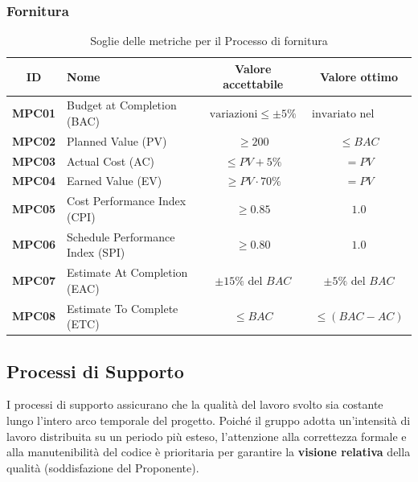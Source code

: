 \documentclass[a4paper,12pt]{article}
\begin{document}
\subsubsection{Fornitura}\label{sec:fornitura}
\begin{table}[H]
\centering
\renewcommand{\arraystretch}{1.5}
\begin{tabularx}{\textwidth}{|c|Y|c|c|}
\hline
{} \textbf{ID} & \textbf{Nome} & \textbf{Valore accettabile} & \textbf{Valore ottimo} \\ \hline
\textbf{MPC01} & Budget at Completion (BAC) & $\text{variazioni}\le \pm 5\%$ & $\text{invariato nel tempo}$ \\ \hline
\textbf{MPC02} & Planned Value (PV) & $\ge 200$ & $\le BAC$ \\ \hline
\textbf{MPC03} & Actual Cost (AC) & $\le PV + 5\%$ & $=PV$ \\ \hline
\textbf{MPC04} & Earned Value (EV) & $\ge PV \cdot 70\%$ & $=PV$ \\ \hline
\textbf{MPC05} & Cost Performance Index (CPI) & $\ge 0.85$ & $1.0$ \\ \hline
\textbf{MPC06} & Schedule Performance Index (SPI) & $\ge 0.80$ & $1.0$ \\ \hline
\textbf{MPC07} & Estimate At Completion (EAC) & $\pm 15\%$ del $BAC$ & $\pm 5\%$ del $BAC$ \\ \hline
\textbf{MPC08} & Estimate To Complete (ETC) & $\le BAC$ & $\le (BAC - AC)$ \\ \hline
\end{tabularx}
\caption{Soglie delle metriche per il Processo di fornitura}
\end{table}

\subsection{Processi di Supporto}\label{sec:processi_supporto}
I processi di supporto assicurano che la qualità del lavoro svolto sia costante lungo l'intero arco temporale del progetto. Poiché il gruppo adotta un'intensità di lavoro distribuita su un periodo più esteso, l'attenzione alla correttezza formale e alla manutenibilità del codice è prioritaria per garantire la \textbf{visione relativa} della qualità (soddisfazione del Proponente).
\end{document}
